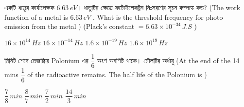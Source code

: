 \documentclass[addpoints]{exam}
\begin{document}
\begin{questions}
\question একটি ধাতুর কার্যাপেক্ষক $ 6.63\,eV $। ধাতুটির ক্ষেত্রে ফটোইলেকট্রন নিঃসরণের সূচন কম্পাঙ্ক কত? (The work function of a metal is $ 6.63\,eV $ . What is the threshold frequency for photo emission from the metal ) (Plack's constant $= 6.63\times 10^{-34}\,J.S $ ) 

\begin{oneparchoices}
\choice $ 16\times 10^{14}\, Hz $
\choice $ 16\times 10^{-14}\, Hz $
\choice $ 1.6\times 10^{-19}\, Hz $
\choice $ 1.6\times 10^{19}\, Hz $
\end{oneparchoices}


 মিনিট শেষে তেজস্ক্রিয় Polonium এর $ \dfrac{1}{6} $ অংশ অবশিষ্ট থাকে। মৌলটির অর্ধায়ু (At the end of the 14 mins $ \dfrac{1}{6} $ of the radioactive remains. The half life of the Polonium is )

\begin{oneparchoices}
\choice $ \dfrac{7}{8}\, min $
\choice $ \dfrac{8}{7}\, min $
\choice $ \dfrac{7}{2}\, min $
\choice $ \dfrac{14}{3}\, min $

\end{oneparchoices}

\end{questions}
\end{document}
